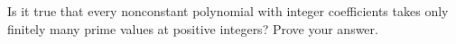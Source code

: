 Is it true that every nonconstant polynomial with integer coefficients takes only finitely many prime values at positive integers? Prove your answer.

